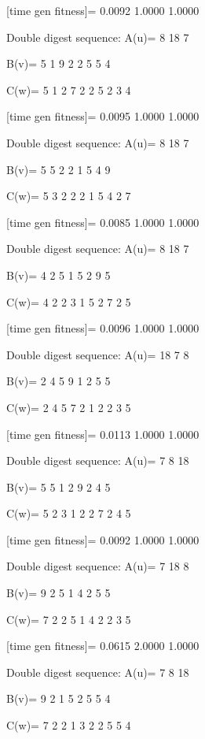 [time gen fitness]=
    0.0092    1.0000    1.0000

Double digest sequence:
A(u)=
     8    18     7

B(v)=
     5     1     9     2     2     5     5     4

C(w)=
     5     1     2     7     2     2     5     2     3     4

[time gen fitness]=
    0.0095    1.0000    1.0000

Double digest sequence:
A(u)=
     8    18     7

B(v)=
     5     5     2     2     1     5     4     9

C(w)=
     5     3     2     2     2     1     5     4     2     7

[time gen fitness]=
    0.0085    1.0000    1.0000

Double digest sequence:
A(u)=
     8    18     7

B(v)=
     4     2     5     1     5     2     9     5

C(w)=
     4     2     2     3     1     5     2     7     2     5

[time gen fitness]=
    0.0096    1.0000    1.0000

Double digest sequence:
A(u)=
    18     7     8

B(v)=
     2     4     5     9     1     2     5     5

C(w)=
     2     4     5     7     2     1     2     2     3     5

[time gen fitness]=
    0.0113    1.0000    1.0000

Double digest sequence:
A(u)=
     7     8    18

B(v)=
     5     5     1     2     9     2     4     5

C(w)=
     5     2     3     1     2     2     7     2     4     5

[time gen fitness]=
    0.0092    1.0000    1.0000

Double digest sequence:
A(u)=
     7    18     8

B(v)=
     9     2     5     1     4     2     5     5

C(w)=
     7     2     2     5     1     4     2     2     3     5

[time gen fitness]=
    0.0615    2.0000    1.0000

Double digest sequence:
A(u)=
     7     8    18

B(v)=
     9     2     1     5     2     5     5     4

C(w)=
     7     2     2     1     3     2     2     5     5     4


